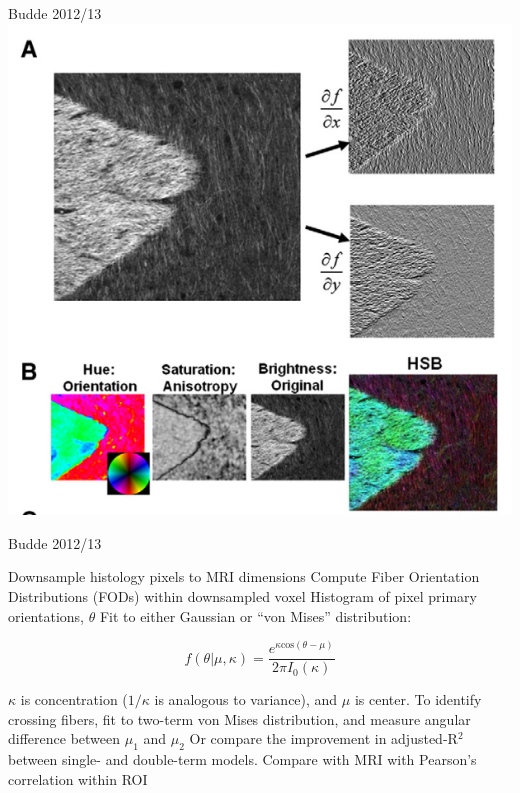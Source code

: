 \documentclass[presentation, 10pt]{beamer}
\begin{document}
  \begin{frame}{Budde 2012/13 \cite{budde2012, budde2013}}
    \centering
    \includegraphics[width=0.9\textheight]{figs/budde_method_1}
  \end{frame}
      
\begin{frame}{Budde 2012/13 \cite{budde2012, budde2013}}
  \begin{outline}
    \1 Downsample histology pixels to MRI dimensions
    \1 Compute Fiber Orientation Distributions (FODs) within downsampled voxel
    \2 Histogram of pixel primary orientations, $\theta$
    \2 Fit to either Gaussian or ``von Mises'' distribution:

    \begin{equation}
      f(\theta|\mu, \kappa) = \frac{e^{\kappa\text{cos}(\theta-\mu)}}{2\pi I_0(\kappa)}
    \end{equation}

    \2 $\kappa$ is concentration ($1 / \kappa$ is analogous to variance), and $\mu$ is center.
    \2 To identify crossing fibers, fit to two-term von Mises distribution, and measure angular difference between $\mu_1$ and $\mu_2$
    \3 Or compare the improvement in adjusted-R$^2$ between single- and double-term  models.
    \1 Compare with MRI with Pearson's correlation within ROI

  \end{outline}
\end{frame}
\end{document}
